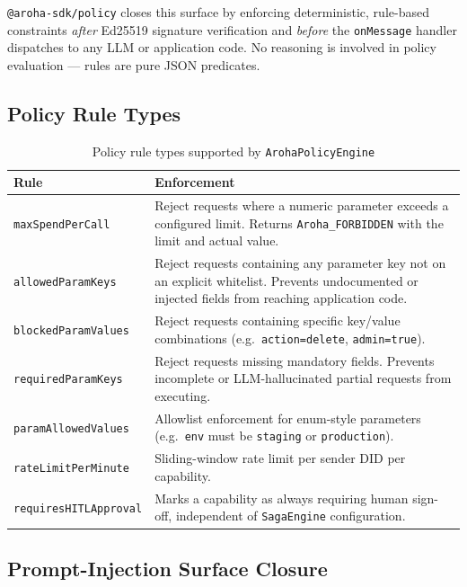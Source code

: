 \documentclass[11pt,a4paper]{article}
\begin{document}
\texttt{@aroha-sdk/policy} closes this surface by enforcing deterministic, rule-based
constraints \textit{after} Ed25519 signature verification and \textit{before}
the \texttt{onMessage} handler dispatches to any LLM or application code.
No reasoning is involved in policy evaluation --- rules are pure JSON predicates.

\subsection{Policy Rule Types}

\begin{table}[ht]
  \centering
  \renewcommand{\arraystretch}{1.4}
  \begin{tabularx}{\textwidth}{@{} l X @{}}
    \toprule
    \textbf{Rule} & \textbf{Enforcement} \\
    \midrule
    \texttt{maxSpendPerCall}
      & Reject requests where a numeric parameter exceeds a configured limit.
        Returns \texttt{Aroha\_FORBIDDEN} with the limit and actual value. \\
    \texttt{allowedParamKeys}
      & Reject requests containing any parameter key not on an explicit whitelist.
        Prevents undocumented or injected fields from reaching application code. \\
    \texttt{blockedParamValues}
      & Reject requests containing specific key/value combinations
        (e.g.\ \texttt{action=delete}, \texttt{admin=true}). \\
    \texttt{requiredParamKeys}
      & Reject requests missing mandatory fields. Prevents incomplete
        or LLM-hallucinated partial requests from executing. \\
    \texttt{paramAllowedValues}
      & Allowlist enforcement for enum-style parameters
        (e.g.\ \texttt{env} must be \texttt{staging} or \texttt{production}). \\
    \texttt{rateLimitPerMinute}
      & Sliding-window rate limit per sender DID per capability. \\
    \texttt{requiresHITLApproval}
      & Marks a capability as always requiring human sign-off, independent
        of \texttt{SagaEngine} configuration. \\
    \bottomrule
  \end{tabularx}
  \caption{Policy rule types supported by \texttt{ArohaPolicyEngine}}
\end{table}

\subsection{Prompt-Injection Surface Closure}
\end{document}
